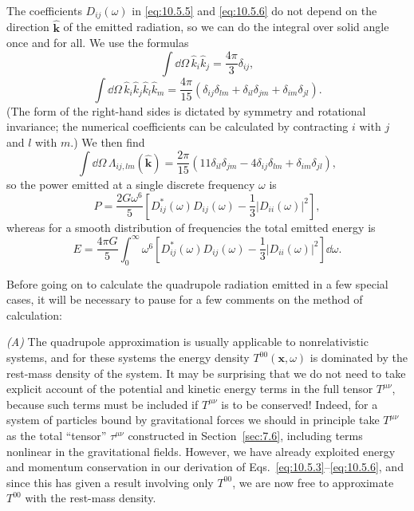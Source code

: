 The coefficients \(D_{ij}(\omega)\) in \eqref{eq:10.5.5} and
\eqref{eq:10.5.6} do not depend on the direction
\(\widehat{\mathbf{k}}\) of the emitted radiation, so we can do the
integral over solid angle once and for all. We use the formulas
\[
  \int \dd\Omega\,\widehat k_i\widehat k_j
  =
  \frac{4\pi}{3}\delta_{ij},
\]
\[
  \int \dd\Omega\,
  \widehat k_i\widehat k_j\widehat k_l\widehat k_m
  =
  \frac{4\pi}{15}
  \left(
    \delta_{ij}\delta_{lm}
    +\delta_{il}\delta_{jm}
    +\delta_{im}\delta_{jl}
  \right).
\]
(The form of the right-hand sides is dictated by symmetry and rotational
invariance; the numerical coefficients can be calculated by contracting
\(i\) with \(j\) and \(l\) with \(m\).) We then find
\[
  \int \dd\Omega\,
  \Lambda_{ij,lm}(\widehat{\mathbf{k}})
  =
  \frac{2\pi}{15}
  \left(
    11\delta_{il}\delta_{jm}
    -4\delta_{ij}\delta_{lm}
    +\delta_{im}\delta_{jl}
  \right),
\]
so the power emitted at a single discrete frequency \(\omega\) is
\begin{equation}
  P
  =
  \frac{2G\omega^6}{5}
  \left[
    D_{ij}^*(\omega)D_{ij}(\omega)
    -\frac13\left|D_{ii}(\omega)\right|^2
  \right],
  \tag{10.5.7}\label{eq:10.5.7}
\end{equation}
whereas for a smooth distribution of frequencies the total emitted energy is
\begin{equation}
  E
  =
  \frac{4\pi G}{5}
  \int_0^\infty
  \omega^6
  \left[
    D_{ij}^*(\omega)D_{ij}(\omega)
    -\frac13\left|D_{ii}(\omega)\right|^2
  \right]\dd\omega.
  \tag{10.5.8}\label{eq:10.5.8}
\end{equation}

Before going on to calculate the quadrupole radiation emitted in a few
special cases, it will be necessary to pause for a few comments on the method
of calculation:

\medskip
\noindent\textit{(A)} The quadrupole approximation is usually applicable to
nonrelativistic systems, and for these systems the energy density
\(T^{00}(\mathbf{x},\omega)\) is dominated by the rest-mass density of the
system. It may be surprising that we do not need to take explicit account of
the potential and kinetic energy terms in the full tensor \(T^{\mu\nu}\),
because such terms must be included if \(T^{\mu\nu}\) is to be conserved!
Indeed, for a system of particles bound by gravitational forces we should in
principle take \(T^{\mu\nu}\) as the total ``tensor'' \(\tau^{\mu\nu}\)
constructed in Section~\ref{sec:7.6}, including terms nonlinear in the
gravitational fields. However, we have already exploited energy and momentum
conservation in our derivation of Eqs.~\eqref{eq:10.5.3}--\eqref{eq:10.5.6},
and since this has given a result involving only \(T^{00}\), we are now free
to approximate \(T^{00}\) with the rest-mass density.

